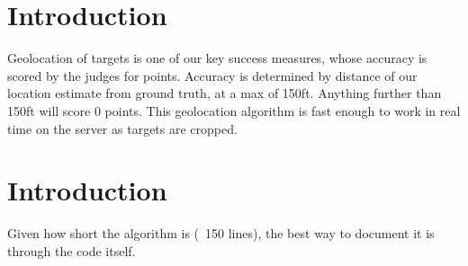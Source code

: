 \documentclass[]{auvsi_doc}
\begin{document}
\begin{AUVSITitlePage}
\begin{artifacttable}
\end{artifacttable}
\end{AUVSITitlePage}

\section{Introduction}

Geolocation of targets is one of our key success measures, whose accuracy is scored 
by the judges for points. Accuracy is determined by distance of our location estimate 
from ground truth, at a max of 150ft. Anything further than 150ft will score 0 points.
This geolocation algorithm is fast enough to work in real time on the server as 
targets are cropped. 

\section{Introduction}

Given how short the algorithm is (~150 lines), the best way to document it is 
through the code itself.


\end{document}
